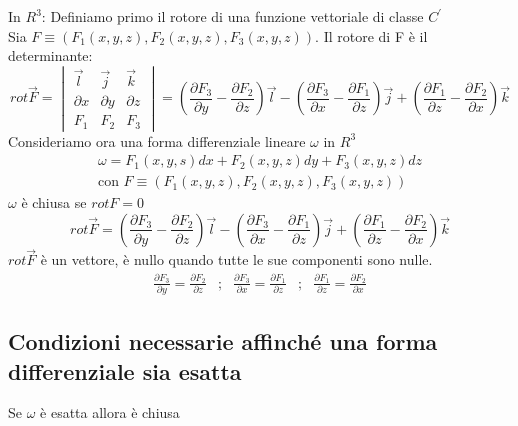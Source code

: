 \begin{center}
	\fbox
	{
		\begin{minipage}{0.85\textwidth}
			In $R^3$: Definiamo primo il rotore di una funzione vettoriale di 
			classe $C^\prime$ \\
			Sia $F\equiv (F_1(x,y,z),F_2(x,y,z),F_3(x,y,z))$. Il rotore di F è 
			il determinante:
			\begin{equation*}
				rot \vec{F}=\begin{vmatrix}
					\vec{l} &\vec{j} &\vec{k} \\
					\partial x & \partial y & \partial z\\
					F_1 & F_2 & F_3
				\end{vmatrix}=\left(\frac{\partial F_3}{\partial y}-
			\frac{\partial F_2}{\partial z}\right)\vec{l} -
				\left(\frac{\partial F_3}{\partial x}-
			\frac{\partial F_1}{\partial z}\right)\vec{j} +
				\left(\frac{\partial F_1}{\partial z}-
				\frac{\partial F_2}{\partial x}\right)\vec{k}
			\end{equation*}
			Consideriamo ora una forma differenziale lineare $\omega$ in $R^3$
			\begin{eqnarray*}
				\omega =F_1(x,y,s)dx+F_2(x,y,z)dy+F_3(x,y,z)dz\\
				\text{con } F\equiv(F_1(x,y,z),F_2(x,y,z), F_3(x,y,z))
			\end{eqnarray*}
			$\omega$ è chiusa se $rot F=0$
			\begin{equation*}
				rot\vec{F}=\left(\frac{\partial F_3}{\partial y}-
			\frac{\partial F_2}{\partial z}\right)\vec{l} -
				\left(\frac{\partial F_3}{\partial x}-
			\frac{\partial F_1}{\partial z}\right)\vec{j} +
				\left(\frac{\partial F_1}{\partial z}-
				\frac{\partial F_2}{\partial x}\right)\vec{k}
			\end{equation*}
			$rot \vec{F}$ è un vettore, è nullo quando tutte le sue componenti
			sono nulle.
			\begin{equation*}
				\begin{matrix}
				\frac{\partial F_3}{\partial y}=\frac{\partial F_2}{\partial z}
				& ; & \frac{\partial F_3}{\partial x}=\frac{\partial
				F_1}{\partial z} & ; &\frac{\partial F_1}{\partial z}=
				\frac{\partial F_2}{\partial x}
				\end{matrix}
			\end{equation*}
		\end{minipage}
	}
\end{center}
\clearpage
\subsection{Condizioni necessarie affinché una forma differenziale sia esatta}
Se $\omega$ è esatta allora è chiusa
